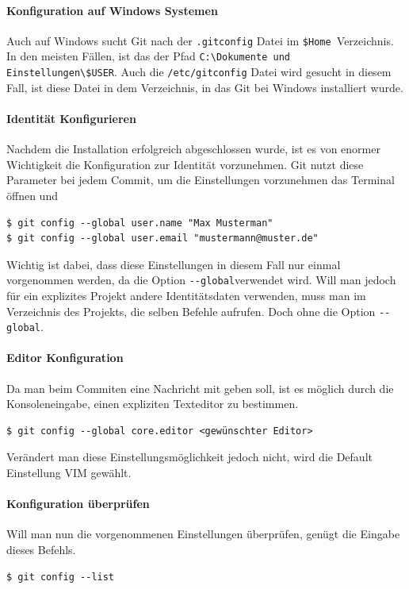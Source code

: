 \documentclass[12pt,a4paper,bibliography=totocnumbered,listof=totocnumbered]{scrartcl}
\begin{document}
\paragraph{Konfiguration auf Windows Systemen}
Auch auf Windows sucht Git nach der \lstinline|.gitconfig| Datei im  \lstinline|$Home |Verzeichnis.  In den meisten Fällen, ist das 
der Pfad \lstinline|C:\Dokumente und Einstellungen\$USER|. Auch die \lstinline|/etc/gitconfig| Datei wird gesucht in diesem Fall, ist diese Datei in dem Verzeichnis, in das Git bei Windows installiert wurde.

\paragraph{Identität Konfigurieren}
Nachdem die Installation erfolgreich abgeschlossen wurde, ist es von enormer Wichtigkeit die Konfiguration zur Identität vorzunehmen. Git nutzt diese Parameter bei jedem Commit,
um die Einstellungen vorzunehmen das Terminal öffnen und
\begin{lstlisting}
$ git config --global user.name "Max Musterman"
$ git config --global user.email "mustermann@muster.de"
\end{lstlisting}
Wichtig ist dabei, dass diese Einstellungen in diesem Fall nur einmal vorgenommen werden, da die Option \lstinline|--global|verwendet wird. Will man jedoch für ein explizites Projekt andere Identitätsdaten verwenden, muss man im Verzeichnis des Projekts, die selben Befehle aufrufen. Doch ohne die Option \lstinline|--global|.
\paragraph{Editor Konfiguration}
Da man beim Commiten eine Nachricht mit geben soll,  ist es möglich durch die Konsoleneingabe,  einen expliziten Texteditor zu bestimmen.
\begin{lstlisting}
$ git config --global core.editor <gewünschter Editor>
\end{lstlisting}
Verändert man diese Einstellungsmöglichkeit jedoch nicht, wird die Default Einstellung VIM gewählt.

\paragraph{Konfiguration überprüfen}
Will man nun die vorgenommenen Einstellungen überprüfen, genügt die Eingabe dieses Befehls.
\begin{lstlisting}
$ git config --list
\end{lstlisting}
\end{document}
